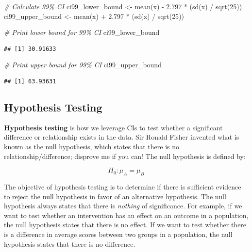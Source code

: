 \documentclass[
]{book}
\newenvironment{Shaded}{\begin{snugshade}}{\end{snugshade}}
\newcommand{\CommentTok}[1]{\textcolor[rgb]{0.56,0.35,0.01}{\textit{#1}}}
\newcommand{\DecValTok}[1]{\textcolor[rgb]{0.00,0.00,0.81}{#1}}
\newcommand{\FloatTok}[1]{\textcolor[rgb]{0.00,0.00,0.81}{#1}}
\newcommand{\FunctionTok}[1]{\textcolor[rgb]{0.00,0.00,0.00}{#1}}
\newcommand{\NormalTok}[1]{#1}
\newcommand{\OtherTok}[1]{\textcolor[rgb]{0.56,0.35,0.01}{#1}}
\newcommand{\SpecialCharTok}[1]{\textcolor[rgb]{0.00,0.00,0.00}{#1}}
\begin{document}
\begin{Shaded}
\begin{Highlighting}[]
\CommentTok{\# Calculate 99\% CI}
\NormalTok{ci99\_lower\_bound }\OtherTok{\textless{}{-}} \FunctionTok{mean}\NormalTok{(x) }\SpecialCharTok{{-}} \FloatTok{2.797} \SpecialCharTok{*}\NormalTok{ (}\FunctionTok{sd}\NormalTok{(x) }\SpecialCharTok{/} \FunctionTok{sqrt}\NormalTok{(}\DecValTok{25}\NormalTok{))}
\NormalTok{ci99\_upper\_bound }\OtherTok{\textless{}{-}} \FunctionTok{mean}\NormalTok{(x) }\SpecialCharTok{+} \FloatTok{2.797} \SpecialCharTok{*}\NormalTok{ (}\FunctionTok{sd}\NormalTok{(x) }\SpecialCharTok{/} \FunctionTok{sqrt}\NormalTok{(}\DecValTok{25}\NormalTok{))}
\end{Highlighting}
\end{Shaded}

\begin{Shaded}
\begin{Highlighting}[]
\CommentTok{\# Print lower bound for 99\% CI}
\NormalTok{ci99\_lower\_bound}
\end{Highlighting}
\end{Shaded}

\begin{verbatim}
## [1] 30.91633
\end{verbatim}

\begin{Shaded}
\begin{Highlighting}[]
\CommentTok{\# Print upper bound for 99\% CI}
\NormalTok{ci99\_upper\_bound}
\end{Highlighting}
\end{Shaded}

\begin{verbatim}
## [1] 63.93631
\end{verbatim}

\hypertarget{hypothesis-testing}{%
\subsection{Hypothesis Testing}\label{hypothesis-testing}}

\textbf{Hypothesis testing} is how we leverage CIs to test whether a significant difference or relationship exists in the data. Sir Ronald Fisher invented what is known as the null hypothesis, which states that there is no relationship/difference; disprove me if you can! The null hypothesis is defined by:

\[ H_0: \mu_A = \mu_B \]

The objective of hypothesis testing is to determine if there is sufficient evidence to reject the null hypothesis in favor of an alternative hypothesis. The null hypothesis always states that there is \emph{nothing} of significance. For example, if we want to test whether an intervention has an effect on an outcome in a population, the null hypothesis states that there is no effect. If we want to test whether there is a difference in average scores between two groups in a population, the null hypothesis states that there is no difference.
\end{document}
